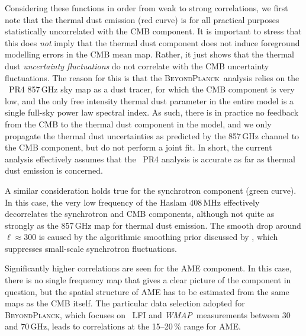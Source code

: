\documentclass[twocolumn]{aa}
\def\WMAP{\textit{WMAP}}
\newcommand{\BP}{\textsc{BeyondPlanck}}
\begin{document}
Considering these functions in order from weak to strong correlations,
we first note that the thermal dust emission (red curve) is for all
practical purposes statistically uncorrelated with the CMB
component. It is important to stress that this does \emph{not} imply
that the thermal dust component does not induce foreground modelling
errors in the CMB mean map. Rather, it just shows that the
thermal dust \emph{uncertainty fluctuations} do not correlate with the
CMB uncertainty fluctuations. The reason for this is that the
\BP\ analysis \citep{bp01} relies on the \Planck\ PR4 857\,GHz sky map
as a dust tracer, for which the CMB component is very low, and the
only free intensity thermal dust parameter in the entire model is a
single full-sky power law spectral index. As such, there is in
practice no feedback from the CMB to the thermal dust component in the
model, and we only propagate the thermal dust
uncertainties as predicted by the 857\,GHz channel to the CMB
component, but do not perform a joint fit. In short, the current
analysis effectively assumes that the \Planck\ PR4 analysis is
accurate as far as thermal dust emission is concerned.

A similar consideration holds true for the synchrotron component
(green curve). In this case, the very low frequency of the Haslam
408\,MHz effectively decorrelates the synchrotron and CMB components,
although not quite as strongly as the 857\,GHz map for thermal dust
emission. The smooth drop around $\ell\approx300$ is caused by the
algorithmic smoothing prior discussed by \citet{bp13}, which
suppresses small-scale synchrotron fluctuations.

Significantly higher correlations are seen for the AME component. In
this case, there is no single frequency map that gives a clear picture
of the component in question, but the spatial structure of AME has to
be estimated from the same maps as the CMB itself. The particular data
selection adopted for \BP, which focuses on \Planck\ LFI and
\WMAP\ measurements between 30 and 70\,GHz, leads to correlations at
the 15--20\,\% range for AME.
\end{document}
